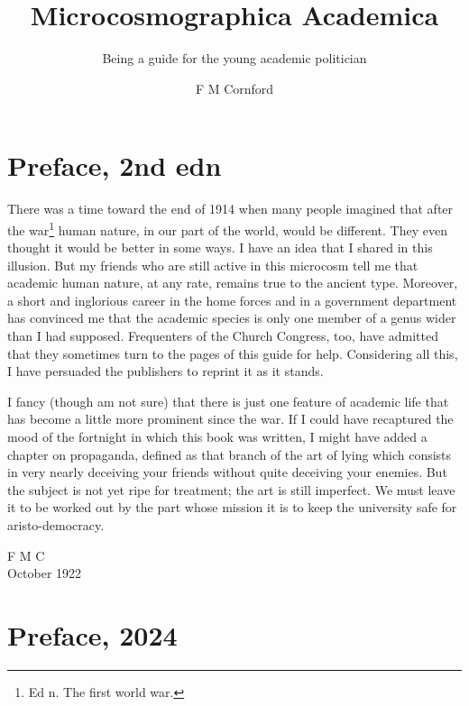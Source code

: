 \documentclass[12pt, oneside, b5paper]{memoir}
\title{Microcosmographica Academica}
\subtitle{Being a guide for the young academic politician}
\author{F M Cornford}
\date{First published 1908 \\
by Metcalfe \& Company Ltd, Cambridge
\vskip 2em
\textcopyright\ 2024 (GPL-2) by ifly6
}
\begin{document}
\begin{titlingpage}
	\maketitle
\end{titlingpage}

\frontmatter

\chapter{Preface, 2nd edn}

There was a time toward the end of 1914 when many people imagined that after the war\footnote{Ed n. The first world war.} human nature, in our part of the world, would be different. They even thought it would be better in some ways. I have an idea that I shared in this illusion. But my friends who are still active in this microcosm tell me that academic human nature, at any rate, remains true to the ancient type. Moreover, a short and inglorious career in the home forces and in a government department has convinced me that the academic species is only one member of a genus wider than I had supposed. Frequenters of the Church Congress, too, have admitted that they sometimes turn to the pages of this guide for help. Considering all this, I have persuaded the publishers to reprint it as it stands.

I fancy (though am not sure) that there is just one feature of academic life that has become a little more prominent since the war. If I could have recaptured the mood of the fortnight in which this book was written, I might have added a chapter on propaganda, defined as that branch of the art of lying which consists in very nearly deceiving your friends without quite deceiving your enemies. But the subject is not yet ripe for treatment; the art is still imperfect. We must leave it to be worked out by the part whose mission it is to keep the university safe for aristo-democracy.

\begin{flushright}
	F M C \\
	October 1922
\end{flushright}

%

\chapter{Preface, 2024}
\end{document}
